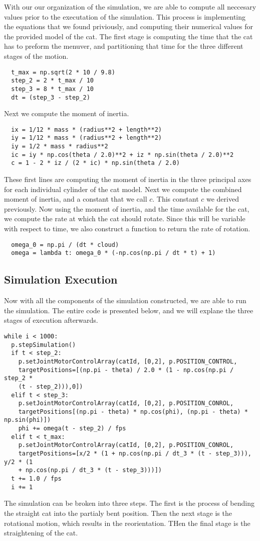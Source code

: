 \documentclass[12]{amsart}
\theoremstyle{definition}
\begin{document}
With our our organization of the simulation, we are able to compute all
neccesary values prior to the executation of the simulation. This process is
implementing the equations that we found priviously, and computing their
numerical values for the provided model of the cat. The first stage is
computing the time that the cat has to preform the menuver, and partitioning
that time for the three different stages of the motion.
\begin{verbatim}
  t_max = np.sqrt(2 * 10 / 9.8)
  step_2 = 2 * t_max / 10
  step_3 = 8 * t_max / 10
  dt = (step_3 - step_2)
\end{verbatim}
Next we compute the moment of inertia.
\begin{verbatim}
  ix = 1/12 * mass * (radius**2 + length**2)
  iy = 1/12 * mass * (radius**2 + length**2)
  iy = 1/2 * mass * radius**2
  ic = iy * np.cos(theta / 2.0)**2 + iz * np.sin(theta / 2.0)**2
  c = 1 - 2 * iz / (2 * ic) * np.sin(theta / 2.0)
\end{verbatim}
These first lines are computing the moment of inertia in the three principal
axes for each individual cylinder of the cat model. Next we compute the
combined moment of inertia, and a constant that we call $c$. This constant $c$
we derived previously. Now using the moment of inertia, and the time available
for the cat, we compute the rate at which the cat should rotate. Since this
will be variable with respect to time, we also construct a function to return
the rate of rotation.
\begin{verbatim}
  omega_0 = np.pi / (dt * cloud)
  omega = lambda t: omega_0 * (-np.cos(np.pi / dt * t) + 1)
\end{verbatim}

\subsection{Simulation Execution}%
\label{sub:simulation_execution}

Now with all the components of the simulation constructed, we are able to run
the simulation. The entire code is presented below, and we will explane the
three stages of execution afterwards.

\begin{verbatim}
while i < 1000:
  p.stepSimulation()
  if t < step_2:
    p.setJointMotorControlArray(catId, [0,2], p.POSITION_CONTROL,
    targetPositions=[(np.pi - theta) / 2.0 * (1 - np.cos(np.pi / step_2 *
    (t - step_2))),0])
  elif t < step_3:
    p.setJointMotorControlArray(catId, [0,2], p.POSITION_CONROL,
    targetPositions[(np.pi - theta) * np.cos(phi), (np.pi - theta) * np.sin(phi)])
    phi += omega(t - step_2) / fps
  elif t < t_max:
    p.setJointMotorControlArray(catId, [0,2], p.POSITION_CONROL,
    targetPositions=[x/2 * (1 + np.cos(np.pi / dt_3 * (t - step_3))), y/2 * (1
    + np.cos(np.pi / dt_3 * (t - step_3)))])
  t += 1.0 / fps
  i += 1
\end{verbatim}
The simulation can be broken into three steps. The first is the process of
bending the straight cat into the partialy bent position. Then the next stage
is the rotational motion, which results in the reorientation. THen the final
stage is the straightening of the cat.
\end{document}
